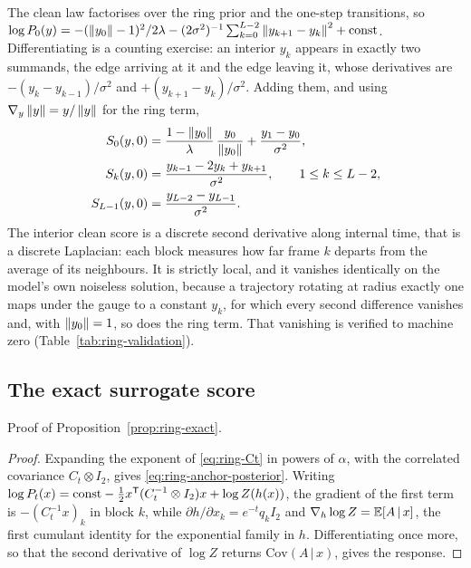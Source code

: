 The clean law factorises over the ring prior and the one-step transitions, so
$\log P_0(y) = -(\left\lVert y_0 \right\rVert-1)^2/2\lambda
- (2\sigma^2)^{-1}\sum_{k=0}^{L-2}\left\lVert y_{k+1}-y_k \right\rVert^2 + \text{const}$.
Differentiating is a counting exercise: an interior $y_k$ appears in exactly two
summands, the edge arriving at it and the edge leaving it, whose derivatives are
$-(y_k - y_{k-1})/\sigma^2$ and $+(y_{k+1} - y_k)/\sigma^2$. Adding them, and
using $\nabla_y \left\lVert y \right\rVert = y/\left\lVert y \right\rVert$ for the ring term,
\begin{align}
  S_0(y,0)
    &= \frac{1-\left\lVert y_0 \right\rVert}{\lambda}\,\frac{y_0}{\left\lVert y_0 \right\rVert}
       + \frac{y_1 - y_0}{\sigma^2},
  \notag \\
  S_k(y,0)
    &= \frac{y_{k-1} - 2y_k + y_{k+1}}{\sigma^2},
       \qquad 1 \le k \le L-2,
  \label{eq:ring-clean-score} \\
  S_{L-1}(y,0)
    &= \frac{y_{L-2}-y_{L-1}}{\sigma^2} .
  \notag
\end{align} The interior clean score is a
discrete second derivative along internal time, that is a discrete Laplacian:
each block measures how far frame $k$ departs from the average of its
neighbours. It is strictly local, and it vanishes identically on the model's
own noiseless solution, because a trajectory rotating at radius exactly one
maps under the gauge to a constant $y_k$, for which every second difference
vanishes and, with $\left\lVert y_0 \right\rVert = 1$, so does the ring term. That vanishing is
verified to machine zero (Table~\ref{tab:ring-validation}).

\subsection{The exact surrogate score}

Proof of Proposition~\ref{prop:ring-exact}.

\begin{proof}
Expanding the exponent of \eqref{eq:ring-Ct} in powers of $\alpha$, with the
correlated covariance $C_t \otimes I_2$, gives
\eqref{eq:ring-anchor-posterior}. Writing
$\log P_t(x) = \text{const} - \tfrac12 x^{\mathsf{T}}(C_t^{-1}\otimes I_2)x
+ \log Z(h(x))$, the gradient of the first term is $-(C_t^{-1}x)_k$ in block
$k$, while $\partial h/\partial x_k = e^{-t}q_k I_2$ and
$\nabla_h \log Z = \mathbb{E}[A\,|\,x]$, the first cumulant identity for the
exponential family in $h$. Differentiating once more, so that the second
derivative of $\log Z$ returns $\mathrm{Cov}(A\,|\,x)$, gives the response.
\end{proof}

